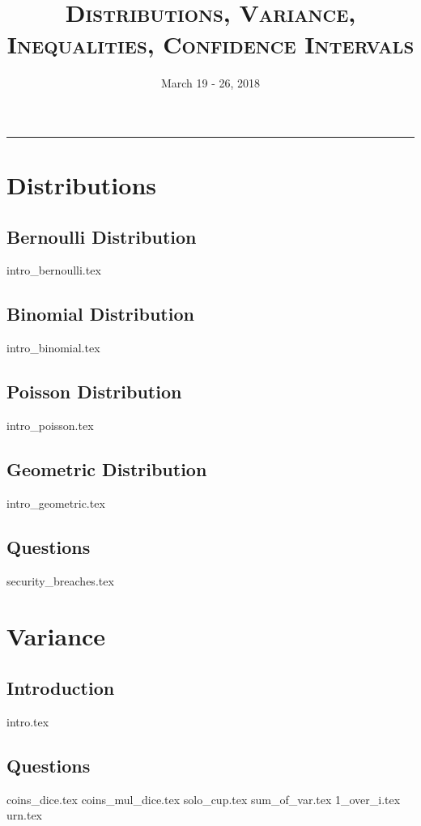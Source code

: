 \documentclass{exam}
\title{\textsc{Distributions, Variance, Inequalities, Confidence Intervals}}
\date{March 19 - 26, 2018}
\begin{document}
\maketitle
\rule{\textwidth}{0.15em}
\fontsize{12}{15}\selectfont
\thispagestyle{empty}

\section{Distributions}
\subsection{Bernoulli Distribution}
{intro_bernoulli.tex}
\subsection{Binomial Distribution}
{intro_binomial.tex}
\subsection{Poisson Distribution}
{intro_poisson.tex}
\subsection{Geometric Distribution}
{intro_geometric.tex}
\subsection{Questions}
\begin{questions}
{security_breaches.tex}
\end{questions}

\section{Variance}
\subsection{Introduction}
{intro.tex}
\subsection{Questions}
\begin{questions}
{coins_dice.tex}
{coins_mul_dice.tex}
{solo_cup.tex}
\clearpage
{sum_of_var.tex}
{1_over_i.tex}
{urn.tex}
\end{questions}
\end{document}
